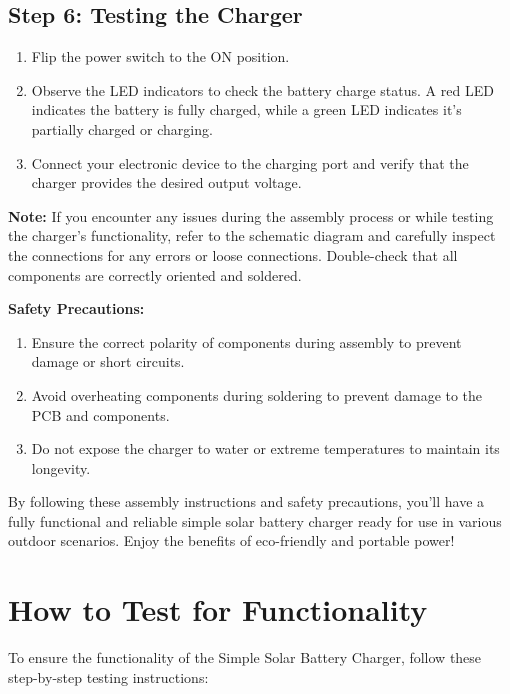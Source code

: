 \documentclass[twocolumn]{article}
\begin{document}
\begin{enumerate}
\subsection*{Step 6: Testing the Charger}
\begin{enumerate}
  \item Flip the power switch to the ON position.
  \item Observe the LED indicators to check the battery charge status. A red LED indicates the battery is fully charged, while a green LED indicates it's partially charged or charging.
  \item Connect your electronic device to the charging port and verify that the charger provides the desired output voltage.
\end{enumerate}

\textbf{Note:} If you encounter any issues during the assembly process or while testing the charger's functionality, refer to the schematic diagram and carefully inspect the connections for any errors or loose connections. Double-check that all components are correctly oriented and soldered.

\textbf{Safety Precautions:}

\begin{enumerate}
  \item Ensure the correct polarity of components during assembly to prevent damage or short circuits.
  \item Avoid overheating components during soldering to prevent damage to the PCB and components.
  \item Do not expose the charger to water or extreme temperatures to maintain its longevity.
\end{enumerate}

By following these assembly instructions and safety precautions, you'll have a fully functional and reliable simple solar battery charger ready for use in various outdoor scenarios. Enjoy the benefits of eco-friendly and portable power!

    
\end{enumerate}

\section*{How to Test for Functionality}

To ensure the functionality of the Simple Solar Battery Charger, follow these step-by-step testing instructions:
\end{document}
